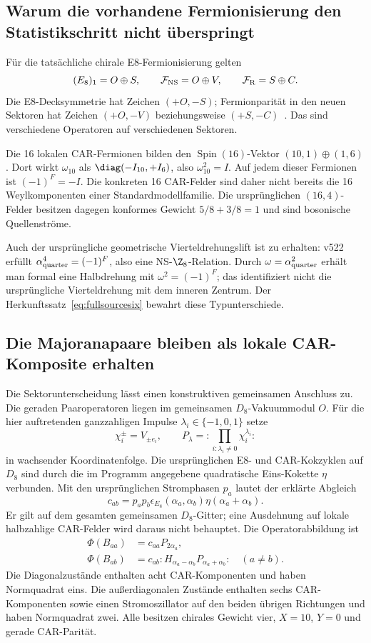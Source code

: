 \subsection{Warum die vorhandene Fermionisierung den Statistikschritt nicht überspringt}
Für die tatsächliche chirale E8-Fermionisierung gelten
\begin{equation}
(E_8)_1=O\oplus S,\qquad
\mathcal F_{\rm NS}=O\oplus V,\qquad
\mathcal F_{\rm R}=S\oplus C.
\end{equation}
Die E8-Decksymmetrie hat Zeichen $(+O,-S)$; Fermionparität in den neuen Sektoren hat Zeichen $(+O,-V)$ beziehungsweise $(+S,-C)$~\cite[Abschnitt 5.1]{boylesmith}. Das sind verschiedene Operatoren auf verschiedenen Sektoren.

Die 16 lokalen CAR-Fermionen bilden den $\operatorname{Spin}(16)$-Vektor $(10,1)\oplus(1,6)$. Dort wirkt $\omega_{10}$ als $\diag(-I_{10},+I_6)$, also $\omega_{10}^2=I$. Auf jedem dieser Fermionen ist $(-1)^F=-I$. Die konkreten 16 CAR-Felder sind daher nicht bereits die 16 Weylkomponenten einer Standardmodellfamilie. Die ursprünglichen $(16,4)$-Felder besitzen dagegen konformes Gewicht $5/8+3/8=1$ und sind bosonische Quellenströme.

Auch der ursprüngliche geometrische Vierteldrehungslift ist zu erhalten: v522 erfüllt $\alpha_{\rm quarter}^4=(-1)^F$, also eine NS-$\Z_8$-Relation. Durch $\omega=\alpha_{\rm quarter}^2$ erhält man formal eine Halbdrehung mit $\omega^2=(-1)^F$; das identifiziert nicht die ursprüngliche Vierteldrehung mit dem inneren Zentrum. Der Herkunftssatz~\eqref{eq:fullsourcesix} bewahrt diese Typunterschiede.

\subsection{Die Majoranapaare bleiben als lokale CAR-Komposite erhalten}\label{sec:carpairdictionary}
Die Sektorunterscheidung lässt einen konstruktiven gemeinsamen Anschluss zu.
Die geraden Paaroperatoren liegen im gemeinsamen $D_8$-Vakuummodul $O$.
Für die hier auftretenden ganzzahligen Impulse $\lambda_i\in\{-1,0,1\}$ setze
\[
\chi_i^\pm=V_{\pm e_i},\qquad
P_\lambda=:\!\prod_{i:\lambda_i\ne0}\chi_i^{\lambda_i}\!:
\]
in wachsender Koordinatenfolge. Die ursprünglichen E8- und CAR-Kokzyklen auf $D_8$
sind durch die im Programm angegebene quadratische Eins-Kokette $\eta$ verbunden.
Mit den ursprünglichen Stromphasen $p_a$ lautet der erklärte Abgleich
\[
c_{ab}=p_ap_b\epsilon_{E_8}(\alpha_a,\alpha_b)\eta(\alpha_a+\alpha_b).
\]
Er gilt auf dem gesamten gemeinsamen $D_8$-Gitter; eine Ausdehnung auf lokale
halbzahlige CAR-Felder wird daraus nicht behauptet. Die Operatorabbildung ist
\begin{align}
 \Phi(B_{aa})&=c_{aa}P_{2\alpha_a},\\
 \Phi(B_{ab})&=c_{ab}:H_{\alpha_a-\alpha_b}P_{\alpha_a+\alpha_b}:\quad(a\ne b).
\end{align}
Die Diagonalzustände enthalten acht CAR-Komponenten und haben Normquadrat eins.
Die außerdiagonalen Zustände enthalten sechs CAR-Komponenten sowie einen
Stromoszillator auf den beiden übrigen Richtungen und haben Normquadrat zwei.
Alle besitzen chirales Gewicht vier, $X=10$, $Y=0$ und gerade CAR-Parität.

